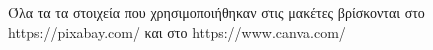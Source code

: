 \documentclass{article}
\begin{document}
\coverpages






\renewcommand*\refname{Βιβλιογραφία}

Όλα τα τα στοιχεία που χρησιμοποιήθηκαν στις μακέτες βρίσκονται στο https://pixabay.com/ \newline και στο https://www.canva.com/
\end{document}
